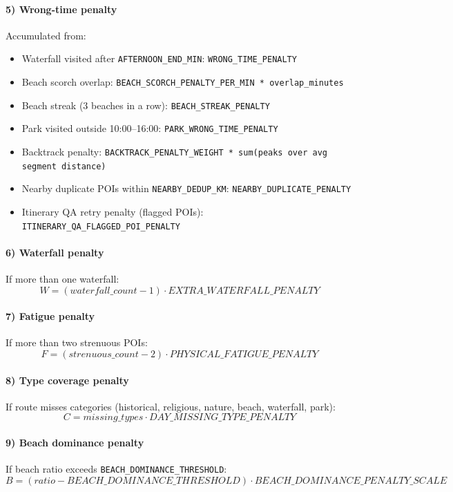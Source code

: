 \documentclass[11pt]{article}
\begin{document}
\paragraph{5) Wrong-time penalty}
Accumulated from:
\begin{itemize}
  \item Waterfall visited after \texttt{AFTERNOON\_END\_MIN}: \texttt{WRONG\_TIME\_PENALTY}
  \item Beach scorch overlap: \texttt{BEACH\_SCORCH\_PENALTY\_PER\_MIN * overlap\_minutes}
  \item Beach streak (3 beaches in a row): \texttt{BEACH\_STREAK\_PENALTY}
  \item Park visited outside 10:00--16:00: \texttt{PARK\_WRONG\_TIME\_PENALTY}
  \item Backtrack penalty: \texttt{BACKTRACK\_PENALTY\_WEIGHT * sum(peaks over avg segment distance)}
  \item Nearby duplicate POIs within \texttt{NEARBY\_DEDUP\_KM}: \texttt{NEARBY\_DUPLICATE\_PENALTY}
  \item Itinerary QA retry penalty (flagged POIs): \texttt{ITINERARY\_QA\_FLAGGED\_POI\_PENALTY}
\end{itemize}

\paragraph{6) Waterfall penalty}
If more than one waterfall:
\[
W = (waterfall\_count - 1) \cdot EXTRA\_WATERFALL\_PENALTY
\]

\paragraph{7) Fatigue penalty}
If more than two strenuous POIs:
\[
F = (strenuous\_count - 2) \cdot PHYSICAL\_FATIGUE\_PENALTY
\]

\paragraph{8) Type coverage penalty}
If route misses categories (historical, religious, nature, beach, waterfall, park):
\[
C = missing\_types \cdot DAY\_MISSING\_TYPE\_PENALTY
\]

\paragraph{9) Beach dominance penalty}
If beach ratio exceeds \texttt{BEACH\_DOMINANCE\_THRESHOLD}:
\[
B = (ratio - BEACH\_DOMINANCE\_THRESHOLD) \cdot BEACH\_DOMINANCE\_PENALTY\_SCALE
\]
\end{document}
